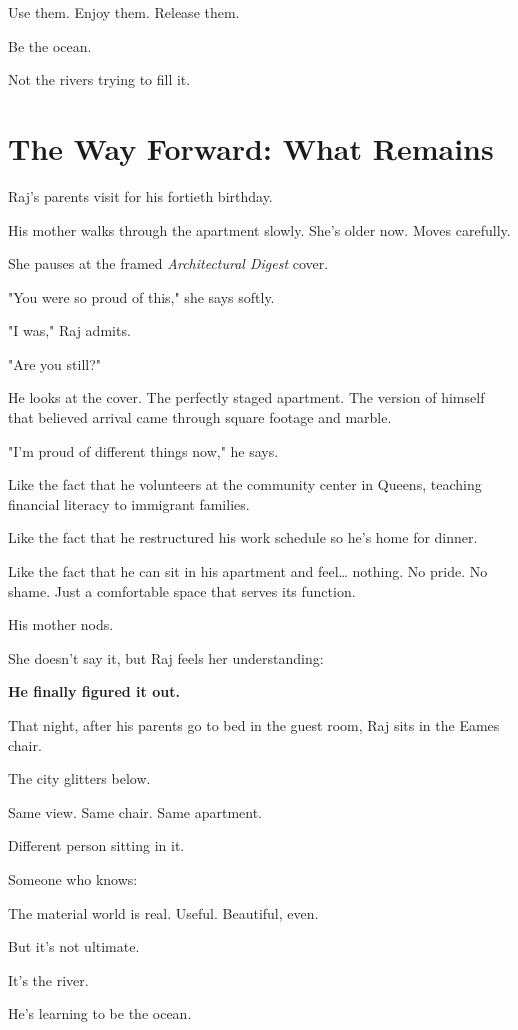 \documentclass[11pt,twoside]{book}
\begin{document}
Use them. Enjoy them. Release them.

Be the ocean.

Not the rivers trying to fill it.

\section*{The Way Forward: What Remains}

Raj's parents visit for his fortieth birthday.

His mother walks through the apartment slowly. She's older now. Moves carefully.

She pauses at the framed \emph{Architectural Digest} cover.

"You were so proud of this," she says softly.

"I was," Raj admits.

"Are you still?"

He looks at the cover. The perfectly staged apartment. The version of himself that believed arrival came through square footage and marble.

"I'm proud of different things now," he says.

Like the fact that he volunteers at the community center in Queens, teaching financial literacy to immigrant families.

Like the fact that he restructured his work schedule so he's home for dinner.

Like the fact that he can sit in his apartment and feel\ldots{} nothing. No pride. No shame. Just a comfortable space that serves its function.

His mother nods.

She doesn't say it, but Raj feels her understanding:

\textbf{He finally figured it out.}

That night, after his parents go to bed in the guest room, Raj sits in the Eames chair.

The city glitters below.

Same view. Same chair. Same apartment.

Different person sitting in it.

Someone who knows:

The material world is real. Useful. Beautiful, even.

But it's not ultimate.

It's the river.

He's learning to be the ocean.
\end{document}
